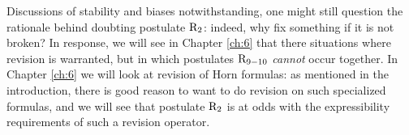 Discussions of stability and biases notwithstanding,
one might still question the rationale behind doubting 
postulate $\mathrm{R}_{2}$:
indeed, why fix something if it is not broken?
In response, we will see in Chapter \ref{ch:6} that 
there situations where revision is warranted, but in which
postulates $\mathrm{R}_{9-10}$ \emph{cannot} occur together.
In Chapter \ref{ch:6} we will look at revision of Horn formulas:
as mentioned in the introduction,
there is good reason to want to do 
revision on such specialized formulas,
and we will see that postulate $\mathrm{R}_{2}$ is at odds 
with the expressibility requirements of 
such a revision operator.

